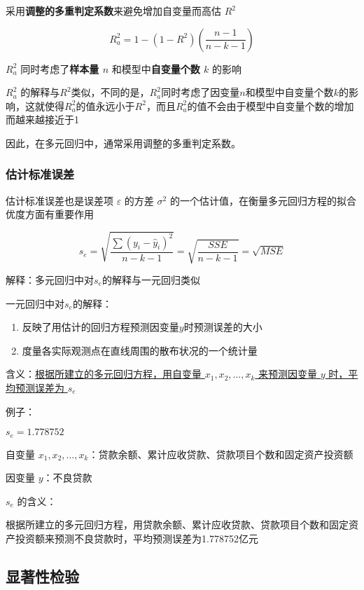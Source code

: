 \documentclass[UTF8,10pt]{book}
\begin{document}
采用\textbf{调整的多重判定系数}来避免增加自变量而高估 \(R^2\)

\[R_a^2 =1-(1-R^2)(\frac{n-1}{n-k-1})\]

\(R_a^2\) 同时考虑了\textbf{样本量 \( n\) }和模型中\textbf{自变量个数
	\(k\) }的影响

\(R_a^2\)
的解释与\(R^2\)类似，不同的是，\(R_a^2\)同时考虑了因变量\(n\)和模型中自变量个数\(k\)的影响，这就使得\(R_a^2\)的值永远小于\(R^2\)，而且\(R_a^2\)的值不会由于模型中自变量个数的增加而越来越接近于1

因此，在多元回归中，通常采用调整的多重判定系数。

\subsubsection{估计标准误差}\label{header-n210}

估计标准误差也是误差项 \(\varepsilon\) 的方差 \( \sigma^2 \)
的一个估计值，在衡量多元回归方程的拟合优度方面有重要作用

\[s_{e}=\sqrt{\frac{\sum\left(y_{i}-\hat{y}_{i}\right)^{2}}{n-k-1}}=\sqrt{\frac{S S E}{n-k-1}}=\sqrt{M S E}\]

解释：多元回归中对\(s_e\)的解释与一元回归类似

一元回归中对\(s_e\)的解释：

\begin{enumerate}
	\def\labelenumi{\arabic{enumi}.}
	\item
	反映了用估计的回归方程预测因变量\(y\)时预测误差的大小
	\item
	度量各实际观测点在直线周围的散布状况的一个统计量
\end{enumerate}

含义：\underline{根据所建立的多元回归方程，用自变量 \(x_1,x_2,...,x_k\)
来预测因变量 \(y\) 时，平均预测误差为 \(s_e\)}

{\kaishu
例子：

\(s_e = 1.778752\)

自变量
\(x_1,x_2,...,x_k\)：贷款余额、累计应收贷款、贷款项目个数和固定资产投资额

因变量 \(y\)：不良贷款

\(s_e\) 的含义：

根据所建立的多元回归方程，用贷款余额、累计应收贷款、贷款项目个数和固定资产投资额来预测不良贷款时，平均预测误差为1.778752亿元
}

\subsection{显著性检验}\label{header-n228}
\end{document}
